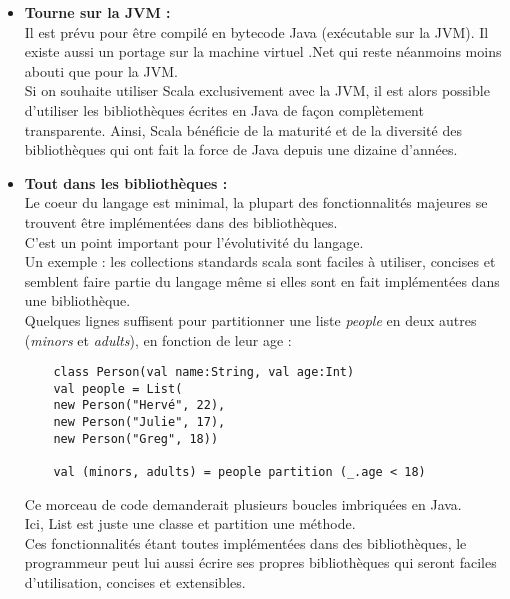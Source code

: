 \begin{itemize}
\item[\textbullet]\textbf{Tourne sur la JVM :}\\
  Il est prévu pour être compilé en bytecode Java (exécutable sur la JVM).
  Il existe aussi un portage sur la machine virtuel .Net qui reste néanmoins
  moins abouti que pour la JVM.\\

  Si on souhaite utiliser Scala exclusivement avec la JVM, il est alors possible
  d'utiliser les bibliothèques écrites en Java de façon complètement
  transparente. Ainsi, Scala bénéficie de la maturité et de la diversité des
  bibliothèques qui ont fait la force de Java depuis une dizaine d'années.\\

\item[\textbullet]\textbf{Tout dans les bibliothèques :}\\
  Le coeur du langage est minimal, la plupart des fonctionnalités majeures se
  trouvent être implémentées dans des bibliothèques.\\
  C'est un point important pour l'évolutivité du langage.\\

  Un exemple : les collections standards scala sont faciles à utiliser, concises
  et semblent faire partie du langage même si elles sont en fait implémentées
  dans une bibliothèque.\\
  Quelques lignes suffisent pour partitionner une liste \textit{people} en deux
  autres (\textit{minors} et \textit{adults}), en fonction de leur age :
\lstset{language=Scala}
\begin{lstlisting}
    class Person(val name:String, val age:Int)
    val people = List(
    new Person("Hervé", 22),
    new Person("Julie", 17),
    new Person("Greg", 18))

    val (minors, adults) = people partition (_.age < 18)
\end{lstlisting}

Ce morceau de code demanderait plusieurs boucles imbriquées en Java.\\
Ici, List est juste une classe et partition une méthode.\\
Ces fonctionnalités étant toutes implémentées dans des bibliothèques,
le programmeur peut lui aussi écrire ses propres bibliothèques qui seront
faciles d'utilisation, concises et extensibles.\\


\end{itemize}
